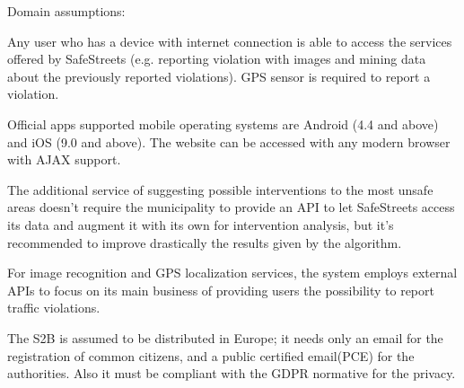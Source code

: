 Domain assumptions:
\begin{enumerate}[label={D\arabic*.}]
	 \label{D_email}
     \label{D_reports}
     \label{D_mun_availability}
   	 \label{D_mun_accuracy}
     \label{D_supervisor}
     \label{D_gps}
     \label{D_internet}
     \label{D_city_auth}
     \label{D_pce}
     \label{D_pce_api}
    \label{D_unique_license_plate}
\end{enumerate}

Any user who has a device with internet connection is able to access the services offered by SafeStreets (e.g. reporting violation with images and mining data about the previously reported violations). GPS sensor is required to report a violation.

Official apps supported mobile operating systems are Android (4.4 and above) and iOS (9.0 and above). The website can be accessed with any modern browser with AJAX support.

The additional service of suggesting possible interventions to the most unsafe areas doesn't require the municipality to provide an API to let SafeStreets access its data and augment it with its own for intervention analysis, but it's recommended to improve drastically the results given by the algorithm.

For image recognition and GPS localization services, the system employs external APIs to focus on its main business of providing users the possibility to report traffic violations.

The S2B is assumed to be distributed in Europe; it needs only an email for the registration of common citizens, and a public certified email(PCE) for the authorities. Also it must be compliant with the GDPR normative for the privacy.